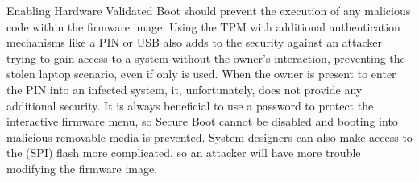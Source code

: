 Enabling Hardware Validated Boot should prevent the execution of any malicious code within the firmware image.
Using the \ac{TPM} with additional authentication mechanisms like a \ac{PIN} or \ac{USB} also adds to the security against an attacker trying to gain access to a system without the owner's interaction, preventing the stolen laptop scenario, even if only \hyperref[tab:pcr-usage]{} is used.
When the owner is present to enter the \ac{PIN} into an infected system, it, unfortunately, does not provide any additional security.
It is always beneficial to use a password to protect the interactive firmware menu, so Secure Boot cannot be disabled and booting into malicious removable media is prevented.
System designers can also make access to the (\ac{SPI}) flash more complicated, so an attacker will have more trouble modifying the firmware image.